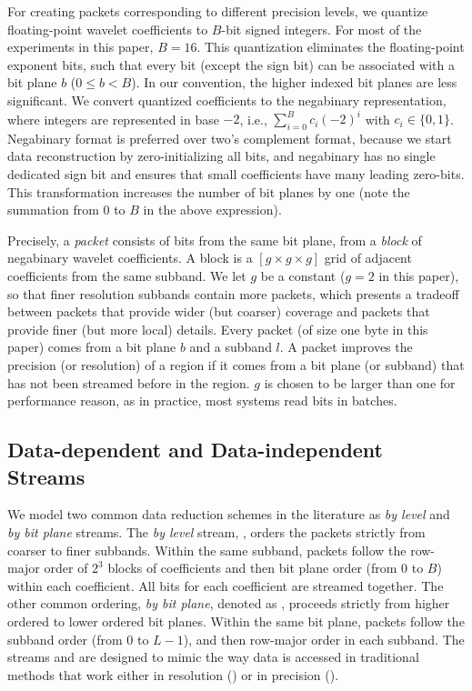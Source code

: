 For creating packets corresponding to different precision levels, we quantize floating-point wavelet
coefficients to $B$-bit signed integers. For most of the experiments in this paper, $B=16$. This
quantization eliminates the floating-point exponent bits, such that every bit (except the sign bit)
can be associated with a bit plane $b$ ($0\leq b < B$). In our convention, the higher indexed bit 
planes are less significant. We convert quantized coefficients to the negabinary representation, where integers are represented in base $-2$, i.e., $\sum_{i=0}^{B}{c_i(-2)^i}$ with $c_i\in \{0,1\}$. 
Negabinary format is preferred over two's complement format, because we start data reconstruction by 
zero-initializing all bits, and negabinary has no single dedicated sign bit and ensures that small coefficients have many leading zero-bits.
%
This transformation increases the number of bit planes by one (note the summation from $0$ to $B$ in
the above expression).

Precisely, a \emph{packet} consists of bits from the same bit plane, from a \emph{block} of negabinary
wavelet coefficients. A block is a $[g\times g\times g]$ grid of adjacent coefficients from the same
subband. We let $g$ be a constant ($g=2$ in this paper), so that finer resolution subbands contain
more packets, which presents a tradeoff between packets that provide wider (but coarser) coverage
and packets that provide finer (but more local) details. Every packet (of size one byte in this paper) 
comes from a bit plane $b$
and a subband $l$. A packet improves the precision (or resolution) of a region if it comes from a
bit plane (or subband) that has not been streamed before in the region. $g$ is chosen to be larger
than one for performance reason, as in practice, most systems read bits in batches.

\subsection{Data-dependent and Data-independent Streams} \label{sec:static-dynamic-streams}

We model two common data reduction schemes in the literature as \emph{by level} and \emph{by bit
plane} streams. The \emph{by level} stream, \slvl, orders the packets strictly from coarser to finer
subbands. Within the same subband, packets follow the row-major order of $2^3$ blocks of
coefficients and then bit plane order (from 0 to $B$) within each coefficient. All bits for each
coefficient are streamed together. The other common ordering, \emph{by bit plane}, denoted as \sbit,
proceeds strictly from higher ordered to lower ordered bit planes. Within the same bit plane,
packets follow the subband order (from $0$ to $L-1$), and then row-major order in each subband. The
streams \slvl and \sbit are designed to mimic the way data is accessed in traditional methods that
work either in resolution (\slvl) or in precision (\sbit).


